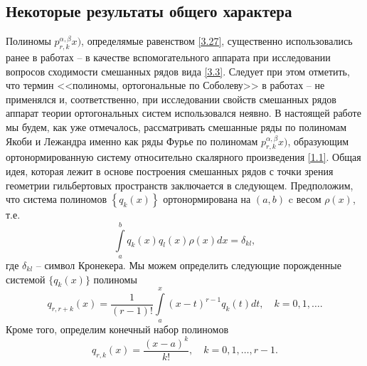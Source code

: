 \subsection{Некоторые результаты общего характера}
Полиномы $p_{r,k}^{\alpha,\beta}x)$, определямые равенством   \eqref{3.27},  существенно использовались ранее в работах \cite{Shar11} -- \cite{SHII} в качестве вспомогательного аппарата при исследовании вопросов сходимости смешанных рядов вида \eqref{3.3}. Следует при этом отметить, что термин <<полиномы, ортогональные по Соболеву>> в работах \cite{Shar11} -- \cite{SHII}  не применялся и, соответственно, при исследовании свойств смешанных рядов аппарат теории ортогональных систем использовался неявно.  В настоящей работе мы будем, как уже отмечалось, рассматривать смешанные ряды по полиномам Якоби и Лежандра именно как ряды Фурье по полиномам $p_{r,k}^{\alpha,\beta}x)$, образующим  ортонормированную систему относительно скалярного произведения \eqref{1.1}. Общая идея, которая лежит в основе построения смешанных рядов с точки зрения геометрии гильбертовых пространств заключается в следующем. Предположим, что система полиномов  $\left\{q_k(x)\right\}$ ортонормирована  на $(a,b)$  c весом   $\rho(x)$, т.е.
 \begin{equation}\label{3.4}
\int\limits_a^bq_k(x)q_l(x)\rho(x)dx=\delta_{kl},
\end{equation}
где $\delta_{kl}$ -- символ Кронекера.  Мы можем определить следующие порожденные системой $\{q_k(x)\}$ полиномы
 \begin{equation}\label{3.5}
q_{r,r+k}(x) =\frac{1}{(r-1)!}\int\limits_a^x(x-t)^{r-1}q_{k}(t)dt, \quad k=0,1,\ldots.
\end{equation}
 Кроме того, определим конечный набор полиномов
  \begin{equation}\label{3.6}
q_{r,k}(x) =\frac{(x-a)^k}{k!}, \quad k=0,1,\ldots, r-1.
\end{equation}

